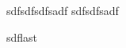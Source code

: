 \documentclass{article}
\begin{document}
\item{sdf}sdfsdfsadf
sdfsdfsadf
\item{sdf}last
    
\end{document}
